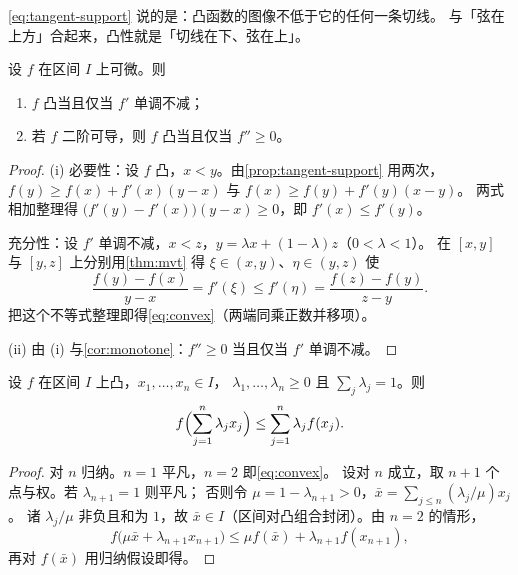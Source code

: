 \begin{intuition}
  \cref{eq:tangent-support} 说的是：凸函数的图像不低于它的任何一条切线。
  与「弦在上方」合起来，凸性就是「切线在下、弦在上」。
\end{intuition}

\begin{theorem}[导数判据]
  \label{thm:convex-derivative}
  设 \(f\) 在区间 \(I\) 上可微。则
  \begin{enumerate}[label=(\roman*)]
    \item \(f\) 凸当且仅当 \(f'\) 单调不减；
    \item 若 \(f\) 二阶可导，则 \(f\) 凸当且仅当 \(f'' \ge 0\)。
  \end{enumerate}
\end{theorem}

\begin{proof}
  (i) 必要性：设 \(f\) 凸，\(x<y\)。由\cref{prop:tangent-support} 用两次，
  \(f(y) \ge f(x)+f'(x)(y-x)\) 与 \(f(x) \ge f(y)+f'(y)(x-y)\)。
  两式相加整理得 \(\bigl(f'(y)-f'(x)\bigr)(y-x) \ge 0\)，即 \(f'(x) \le f'(y)\)。

  充分性：设 \(f'\) 单调不减，\(x<z\)，\(y=\lambda x+(1-\lambda)z\)（\(0<\lambda<1\)）。
  在 \([x,y]\) 与 \([y,z]\) 上分别用\cref{thm:mvt} 得 \(\xi \in (x,y)\)、\(\eta \in (y,z)\) 使
  \[
    \frac{f(y)-f(x)}{y-x} = f'(\xi) \le f'(\eta) = \frac{f(z)-f(y)}{z-y} .
  \]
  把这个不等式整理即得\cref{eq:convex}（两端同乘正数并移项）。

  (ii) 由 (i) 与\cref{cor:monotone}：\(f'' \ge 0\) 当且仅当 \(f'\) 单调不减。
\end{proof}

\begin{theorem}
  \label{thm:jensen}
  设 \(f\) 在区间 \(I\) 上凸，\(x_{1},\dots,x_{n} \in I\)，
  \(\lambda_{1},\dots,\lambda_{n} \ge 0\) 且 \(\sum_{j}\lambda_{j}=1\)。则
  \[
    f\Bigl(\sum_{j=1}^{n}\lambda_{j}x_{j}\Bigr) \le \sum_{j=1}^{n}\lambda_{j}f(x_{j}) .
  \]
\end{theorem}

\begin{proof}
  对 \(n\) 归纳。\(n=1\) 平凡，\(n=2\) 即\cref{eq:convex}。
  设对 \(n\) 成立，取 \(n+1\) 个点与权。若 \(\lambda_{n+1}=1\) 则平凡；
  否则令 \(\mu = 1-\lambda_{n+1} > 0\)，\(\bar{x} = \sum_{j \le n}(\lambda_{j}/\mu)x_{j}\)。
  诸 \(\lambda_{j}/\mu\) 非负且和为 \(1\)，故 \(\bar{x} \in I\)（区间对凸组合封闭）。由 \(n=2\) 的情形，
  \[
    f\bigl(\mu\bar{x}+\lambda_{n+1}x_{n+1}\bigr)
      \le \mu f(\bar{x}) + \lambda_{n+1}f(x_{n+1}) ,
  \]
  再对 \(f(\bar{x})\) 用归纳假设即得。
\end{proof}

